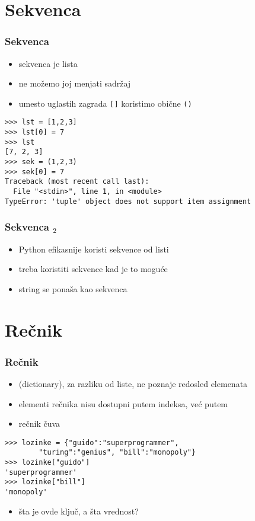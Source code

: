 \documentclass[utf8,compress,aspectratio=169]{beamer}
\begin{document}
\section[Sekvenca]{Sekvenca}

\begin{frame}[fragile]
  \frametitle{Sekvenca}
  \begin{itemize}
    \item sekvenca je  lista
    \item ne možemo joj menjati sadržaj
    \item umesto uglastih zagrada \texttt{[]} koristimo obične \texttt{()}
  \end{itemize}
\begin{verbatim}
>>> lst = [1,2,3]
>>> lst[0] = 7
>>> lst
[7, 2, 3]
>>> sek = (1,2,3)
>>> sek[0] = 7
Traceback (most recent call last):
  File "<stdin>", line 1, in <module>
TypeError: 'tuple' object does not support item assignment
\end{verbatim}
\end{frame}

\begin{frame}[fragile]
  \frametitle{Sekvenca $_2$}
  \begin{itemize}
    \item Python efikasnije koristi sekvence od listi
    \item treba koristiti sekvence kad je to moguće
    \item string se ponaša kao sekvenca
  \end{itemize}
\end{frame}


\section[Rečnik]{Rečnik}

\begin{frame}[fragile]
  \frametitle{Rečnik}
  \begin{itemize}
    \item {} (dictionary), za razliku od liste, ne poznaje redosled elemenata
    \item elementi rečnika nisu dostupni putem indeksa, već putem 
    \item rečnik čuva 
  \end{itemize}
\begin{verbatim}
>>> lozinke = {"guido":"superprogrammer",
        "turing":"genius", "bill":"monopoly"}
>>> lozinke["guido"]
'superprogrammer'
>>> lozinke["bill"]
'monopoly'
\end{verbatim}
  \begin{itemize}
    \item šta je ovde ključ, a šta vrednost?
  \end{itemize}
\end{frame}
\end{document}
